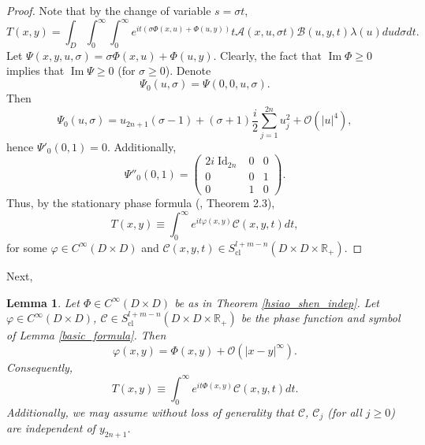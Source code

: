 \documentclass{article}
\newtheorem{lemma}[theorem]{Lemma}
\newcommand{\RR}{\mathbb R}
\newcommand{\mca}{\mathcal A}
\newcommand{\mcb}{\mathcal B}
\newcommand{\mcc}{\mathcal C}
\newcommand{\mco}{\mathcal O}
\DeclareMathOperator{\im}{Im}
\DeclareMathOperator{\Id}{Id}
\DeclareMathOperator{\cl}{cl}
\begin{document}
\begin{proof}
%
Note that by the change of variable $s = \sigma t$,
\begin{equation}\label{for_diag_comp}T(x,y) = \int_D \int_0^\infty \int_0^\infty e^{it(\sigma \Phi(x,u) + \Phi(u, y))} t \mca(x, u, \sigma t) \mcb(u, y, t) \lambda(u) du d\sigma dt.\end{equation}
%
Let $\Psi(x,y,u,\sigma) = \sigma \Phi(x,u) + \Phi(u,y)$. Clearly, the fact that $\im \Phi \ge 0$ implies that $\im \Psi\ge 0$ (for $\sigma \ge 0$). Denote \begin{equation}\label{phase_0}\Psi_0(u, \sigma) = \Psi(0,0,u, \sigma).\end{equation} Then
%
\begin{equation*} \Psi_0(u, \sigma) = u_{2n+1}(\sigma-1) + (\sigma+1) \frac i 2 \sum_{j=1}^{2n} u_{j}^2 + \mco(|u|^4),\end{equation*}
%
hence $\Psi'_0(0,1) = 0$.
%
Additionally,
\begin{equation*} \Psi''_0(0,1) = \left(\begin{array}{ccc} 2i \Id_{2n} & 0 & 0 \\ 0 & 0 & 1 \\ 0 & 1 & 0 \end{array}\right).\end{equation*}
Thus, by the stationary phase formula (\cite{ms}, Theorem 2.3),
\begin{equation}\label{T_E_ker} T(x,y) \equiv \int_0^\infty e^{i t \varphi(x,y)} \mcc(x,y,t) dt,\end{equation}
for some $\varphi \in C^\infty(D \times D)$ and $\mcc(x,y,t) \in S^{l+m-n}_{\cl}(D \times D \times \RR_+)$.
\end{proof}
%
Next,
\begin{lemma}\label{local_unique_noncanonic} Let $\Phi \in C^\infty(D \times D)$ be as in Theorem \ref{hsiao_shen_indep}. Let $\varphi \in C^\infty(D \times D)$, $\mcc \in S^{l+m-n}_{\cl}(D \times D \times \RR_+)$ be the phase function and symbol of Lemma \ref{basic_formula}. Then $$\varphi(x,y) = \Phi(x,y) + \mco(|x-y|^\infty).$$
%
Consequently,
\begin{equation}\label{product_kernel_local} T(x,y) \equiv \int_0^\infty e^{it \Phi(x,y)} \mcc(x,y,t) dt.\end{equation}
Additionally, we may assume without loss of generality that $\mcc$, $\mcc_j$ (for all $j \ge 0$) are independent of $y_{2n+1}$.\end{lemma}
%
\end{document}
